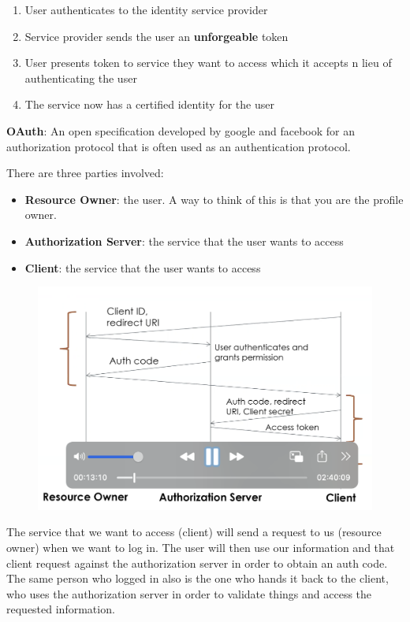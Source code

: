\documentclass[../notes.tex]{subfiles}
\begin{document}
\begin{enumerate}
    \item User authenticates to the identity service provider
    \item Service provider sends the user an \textbf{unforgeable}  token
    \item User presents token to service they want to access which it accepts n lieu of authenticating the user
    \item The service now has a certified identity for the user
\end{enumerate}


\begin{example}
    \textbf{OAuth}:  An open specification developed by google and facebook for an authorization protocol that is often used as an authentication protocol.

    There are three parties involved:
    \begin{itemize}
        \item \textbf{Resource Owner}: the user. A way to think of this is that you are the profile owner.
        \item \textbf{Authorization Server}: the service that the user wants to access
        \item \textbf{Client}: the service that the user wants to access
    \end{itemize}

    \begin{figure}[H]
        \centering
        \includegraphics[width=0.8\linewidth]{img/image_2023-03-27-20-56-02.png}
    \end{figure}

    The service that we want to access (client) will send a request to us (resource owner) when we want to log in. The user will then use our information and that client request against the authorization server in order to obtain an auth code. The same person who logged in also is the one who hands it back to the client, who uses the authorization server in order to validate things and access the requested information.
\end{example}
\end{document}
